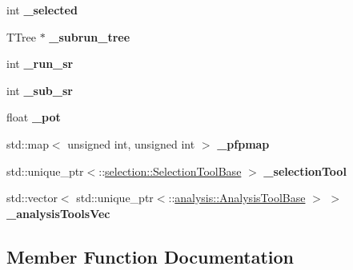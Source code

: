 \begin{DoxyCompactItemize}
\item 
int {\bfseries \+\_\+selected}\hypertarget{classNeutrinoSelectionFilter_a50c00840d977534f08a8405d3b6db8a7}{}\label{classNeutrinoSelectionFilter_a50c00840d977534f08a8405d3b6db8a7}

\item 
T\+Tree $\ast$ {\bfseries \+\_\+subrun\+\_\+tree}\hypertarget{classNeutrinoSelectionFilter_a6fd2c4dbb3f1d6b4f618bde415bb10a6}{}\label{classNeutrinoSelectionFilter_a6fd2c4dbb3f1d6b4f618bde415bb10a6}

\item 
int {\bfseries \+\_\+run\+\_\+sr}\hypertarget{classNeutrinoSelectionFilter_a057d305cb1ca799934c803b25f95ba33}{}\label{classNeutrinoSelectionFilter_a057d305cb1ca799934c803b25f95ba33}

\item 
int {\bfseries \+\_\+sub\+\_\+sr}\hypertarget{classNeutrinoSelectionFilter_a67a30e788850a2ad92f084403b654e46}{}\label{classNeutrinoSelectionFilter_a67a30e788850a2ad92f084403b654e46}

\item 
float {\bfseries \+\_\+pot}\hypertarget{classNeutrinoSelectionFilter_ab1d8bff6417f53e7fcaaad1762d09c23}{}\label{classNeutrinoSelectionFilter_ab1d8bff6417f53e7fcaaad1762d09c23}

\item 
std\+::map$<$ unsigned int, unsigned int $>$ {\bfseries \+\_\+pfpmap}\hypertarget{classNeutrinoSelectionFilter_a151658388ac5141bb8f1925dbf056bb7}{}\label{classNeutrinoSelectionFilter_a151658388ac5141bb8f1925dbf056bb7}

\item 
std\+::unique\+\_\+ptr$<$\+::\hyperlink{classselection_1_1SelectionToolBase}{selection\+::\+Selection\+Tool\+Base} $>$ {\bfseries \+\_\+selection\+Tool}\hypertarget{classNeutrinoSelectionFilter_ac0b82d00453b3f98cf15961ba7067f62}{}\label{classNeutrinoSelectionFilter_ac0b82d00453b3f98cf15961ba7067f62}

\item 
std\+::vector$<$ std\+::unique\+\_\+ptr$<$\+::\hyperlink{classanalysis_1_1AnalysisToolBase}{analysis\+::\+Analysis\+Tool\+Base} $>$ $>$ {\bfseries \+\_\+analysis\+Tools\+Vec}\hypertarget{classNeutrinoSelectionFilter_a738fc1190d850076e7cd32f000c7e518}{}\label{classNeutrinoSelectionFilter_a738fc1190d850076e7cd32f000c7e518}

\end{DoxyCompactItemize}


\subsection{Member Function Documentation}

